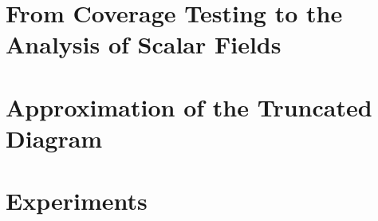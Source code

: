\documentclass[a4paper,UKenglish,cleveref, autoref, thm-restate]{lipics/socg-lipics-v2019}
\begin{document}

%

\section{From Coverage Testing to the Analysis of Scalar Fields}\label{sec:middle}
% 

%

  


\section{Approximation of the Truncated Diagram}\label{sec:truncations}

\section{Experiments}
%




\end{document}
